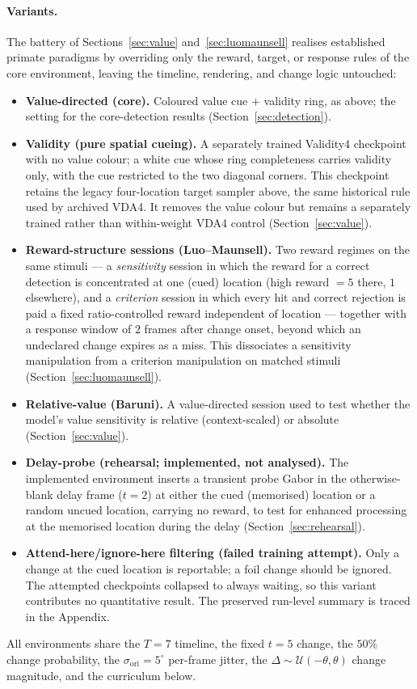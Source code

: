 \paragraph{Variants.}
The battery of Sections~\ref{sec:value} and~\ref{sec:luomaunsell} realises
established primate paradigms by overriding only the reward, target, or
response rules of the core environment, leaving the timeline, rendering,
and change logic untouched:
\begin{itemize}
\item \textbf{Value-directed (core).} Coloured value cue $+$ validity ring,
  as above; the setting for the core-detection results
  (Section~\ref{sec:detection}).
\item \textbf{Validity (pure spatial cueing).} A separately trained Validity4
  checkpoint with no value colour; a
  white cue whose ring completeness carries validity only, with the cue
  restricted to the two diagonal corners. This checkpoint retains the legacy
  four-location target sampler above, the same historical rule used by archived
  VDA4. It removes the value colour but remains a separately trained rather than
  within-weight VDA4 control
  (Section~\ref{sec:value}).
\item \textbf{Reward-structure sessions (Luo--Maunsell).} Two reward
  regimes on the same stimuli --- a \emph{sensitivity} session in which the
  reward for a correct detection is concentrated at one (cued) location
  (high reward $= 5$ there, $1$ elsewhere), and a \emph{criterion} session
  in which every hit and correct rejection is paid a fixed
  ratio-controlled reward independent of location --- together with a
  response window of $2$ frames after change onset, beyond which an
  undeclared change expires as a miss. This dissociates a sensitivity
  manipulation from a criterion manipulation on matched stimuli
  \cite{luo_maunsell2018_criterion_sensitivity}
  (Section~\ref{sec:luomaunsell}).
\item \textbf{Relative-value (Baruni).} A value-directed session used to
  test whether the model's value sensitivity is relative (context-scaled)
  or absolute (Section~\ref{sec:value}).
\item \textbf{Delay-probe (rehearsal; implemented, not analysed).} The
  implemented environment inserts a transient probe Gabor in the otherwise-blank
  delay frame ($t = 2$) at either the cued (memorised) location or a random
  uncued location, carrying no reward, to test for enhanced processing at the
  memorised location during the delay
  \cite{awh_jonides_reuterlorenz1998_rehearsal}
  (Section~\ref{sec:rehearsal}).
\item \textbf{Attend-here/ignore-here filtering (failed training attempt).}
  Only a change at the cued location is reportable; a foil change should be ignored.
  The attempted checkpoints collapsed to always waiting, so this variant contributes
  no quantitative result. The preserved run-level summary is traced in the Appendix.
\end{itemize}
All environments share the $T = 7$ timeline, the fixed $t = 5$ change, the
$50\%$ change probability, the $\sigma_{\mathrm{ori}} = 5^\circ$ per-frame
jitter, the $\Delta \sim \mathcal{U}(-\theta, \theta)$ change magnitude,
and the curriculum below.

